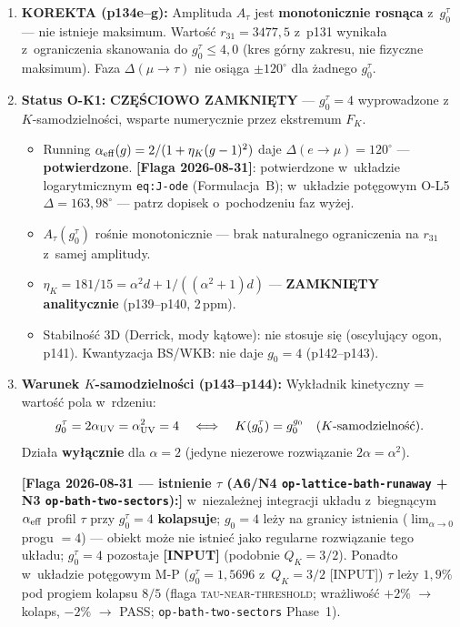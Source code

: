 \begin{enumerate}
  \item \textbf{KOREKTA (p134e--g):} Amplituda $A_\tau$ jest
    \textbf{monotonicznie rosn\k{a}ca} z~$g_0^\tau$ --- nie istnieje
    maksimum. Warto\'s\'c $r_{31} = 3477{,}5$ z~p131 wynika\l{}a
    z~ograniczenia skanowania do $g_0^\tau \le 4{,}0$ (kres g\'orny
    zakresu, nie fizyczne maksimum). Faza $\Delta(\mu\to\tau)$ nie
    osi\k{a}ga $\pm120^\circ$ dla \.zadnego $g_0^\tau$.

  \item \textbf{Status O-K1:}
    \textbf{CZ\k{E}\'SCIOWO ZAMKNI\k{E}TY} --- $g_0^\tau = 4$
    wyprowadzone z~$K$-samodzielno\'sci, wsparte numerycznie przez
    ekstremum $F_K$.
    \begin{itemize}[nosep]
      \item Running $\alpha_{\rm eff}(g) = 2/(1+\eta_K(g-1)^2)$
            daje $\Delta(e\to\mu) = 120^\circ$ --- \textbf{potwierdzone}.
            \textbf{[Flaga 2026-08-31]}: potwierdzone w~uk\l{}adzie
            logarytmicznym \texttt{eq:J-ode} (Formulacja~B);
            w~uk\l{}adzie pot\k{e}gowym O-L5 $\Delta=163{,}98^\circ$
            --- patrz dopisek o~pochodzeniu faz wy\.zej.
      \item $A_\tau(g_0^\tau)$ ro\'snie monotonicznie
            --- brak naturalnego ograniczenia na $r_{31}$ z~samej amplitudy.
      \item $\eta_K = 181/15 = \alpha^2 d + 1/((\alpha^2+1)d)$
            --- \textbf{ZAMKNI\k{E}TY analitycznie} (p139--p140, 2\,ppm).
      \item Stabilno\'s\'c 3D (Derrick, mody k\k{a}towe): nie stosuje si\k{e}
            (oscyluj\k{a}cy ogon, p141). Kwantyzacja BS/WKB: nie daje $g_0=4$ (p142--p143).
    \end{itemize}

  \item \textbf{Warunek $K$-samodzielno\'sci (p143--p144):}
    Wyk\l{}adnik kinetyczny = warto\'s\'c pola w~rdzeniu:
    \begin{equation}
      g_0^\tau = 2\alpha_{\rm UV} = \alpha_{\rm UV}^2 = 4
      \quad\Longleftrightarrow\quad
      K(g_0^\tau) = g_0^{g_0} \quad\text{($K$-samodzielno\'s\'c)}.
    \end{equation}
    Dzia\l{}a \textbf{wy\l{}\k{a}cznie} dla $\alpha=2$ (jedyne niezerowe
    rozwi\k{a}zanie $2\alpha = \alpha^2$).

    \textbf{[Flaga 2026-08-31 --- istnienie $\tau$ (A6/N4
    \texttt{op-lattice-bath-runaway} + N3
    \texttt{op-bath-two-sectors}):]}
    w~niezale\.znej integracji uk\l{}adu z~biegn\k{a}cym
    $\alpha_{\rm eff}$ profil $\tau$ przy $g_0^\tau=4$
    \textbf{kolapsuje}; $g_0=4$ le\.zy na granicy istnienia
    ($\lim_{\alpha\to0}$ progu $=4$) --- obiekt mo\.ze nie
    istnie\'c jako regularne rozwi\k{a}zanie tego uk\l{}adu;
    $g_0^\tau=4$ pozostaje \textbf{[INPUT]} (podobnie $Q_K=3/2$).
    Ponadto w~uk\l{}adzie pot\k{e}gowym M-P
    ($g_0^\tau=1{,}5696$ z~$Q_K=3/2$ [INPUT]) $\tau$ le\.zy
    $1{,}9\%$ pod progiem kolapsu $8/5$
    (flaga \textsc{tau-near-threshold}; wra\.zliwo\'s\'c
    $+2\%$ $\to$ kolaps, $-2\%$ $\to$ PASS;
    \texttt{op-bath-two-sectors} Phase~1).


\end{enumerate}
